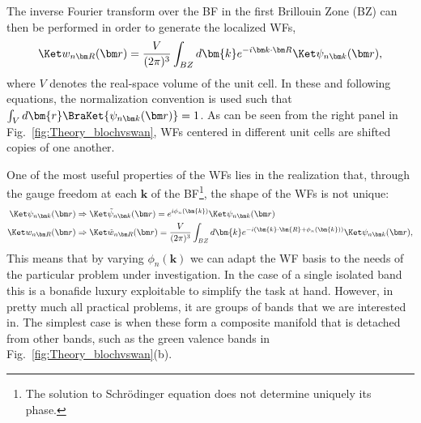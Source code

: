 The inverse Fourier transform over the BF in the first Brillouin Zone (BZ) can then be performed in order to generate the localized WFs,
\begin{equation}
	\label{eq:Theory_wanfourier}
	\WanKet{n}{R} = \frac{V}{(2\pi)^3} \int_{BZ} d \bm{k} \inveikr{R} \BlochKet{n},
\end{equation}
where $V$ denotes the real-space volume of the unit cell.
In these and following equations, the normalization convention is used such that $\int_V d\bm{r}\BraKet{\Bloch{n}} = 1$.
As can be seen from the right panel in Fig.~\ref{fig:Theory_blochvswan}, WFs centered in different unit cells are shifted copies of one another.

One of the most useful properties of the WFs lies in the realization that, through the gauge freedom at each $\bm{k}$ of the BF\footnote{The solution to Schr\"odinger equation does not determine uniquely its phase.}, the shape of the WFs is not unique:
\begin{align}
	\BlochKet{n} &\Rightarrow \tildeBlochKet{n} = e^{i \phi_n(\bm{k})} \BlochKet{n} \\
	\WanKet{n}{R} &\Rightarrow \tildeWanKet{n}{R} = \frac{V}{(2\pi)^3} \int_{BZ} d \bm{k} e^{-i (\bm{k} \cdot \bm{R} + \phi_n(\bm{k}))} \BlochKet{n},
\end{align}
This means that by varying $\phi_n(\bm{k})$ we can adapt the WF basis to the needs of the particular problem under investigation.
In the case of a single isolated band this is a bonafide luxury exploitable to simplify the task at hand.
However, in pretty much all practical problems, it are groups of bands that we are interested in.
The simplest case is when these form a composite manifold that is detached from other bands, such as the green valence bands in Fig.~\ref{fig:Theory_blochvswan}(b).

